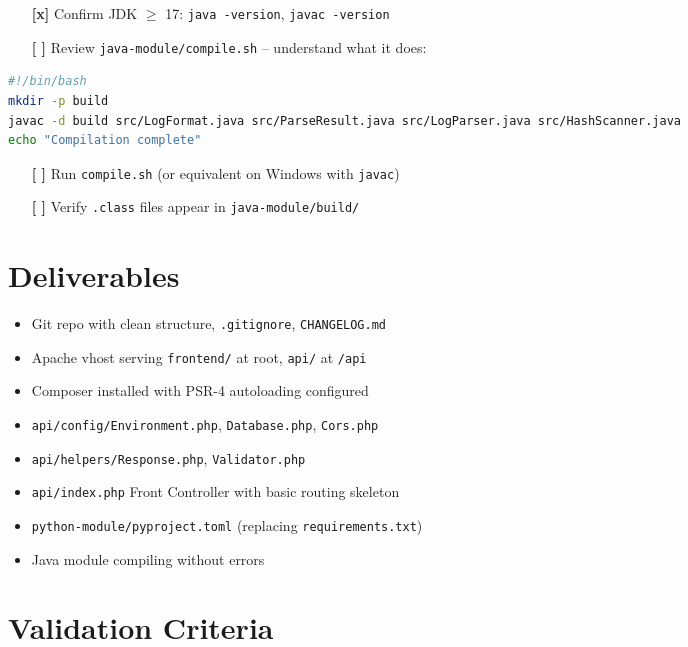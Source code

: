\documentclass[11pt,a4paper]{report}
\newcommand{\todo}{\textcolor{helixamber}{\textbf{[ ]}}}
\newcommand{\done}{\textcolor{helixteal}{\textbf{[x]}}}
\newcommand{\filepath}[1]{\texttt{\small#1}}
\begin{document}
\begin{itemize}
    \item[\done] Confirm JDK $\geq$ 17: \texttt{java -version}, \texttt{javac -version}
    \item[\todo] Review \filepath{java-module/compile.sh} -- understand what it does:
\end{itemize}

\begin{lstlisting}[language=bash]
#!/bin/bash
mkdir -p build
javac -d build src/LogFormat.java src/ParseResult.java src/LogParser.java src/HashScanner.java
echo "Compilation complete"
\end{lstlisting}

\begin{itemize}
    \item[\todo] Run \filepath{compile.sh} (or equivalent on Windows with \texttt{javac})
    \item[\todo] Verify \texttt{.class} files appear in \filepath{java-module/build/}
\end{itemize}

\section*{Deliverables}

\begin{itemize}
    \item Git repo with clean structure, \filepath{.gitignore}, \filepath{CHANGELOG.md}
    \item Apache vhost serving \filepath{frontend/} at root, \filepath{api/} at \texttt{/api}
    \item Composer installed with PSR-4 autoloading configured
    \item \filepath{api/config/Environment.php}, \filepath{Database.php}, \filepath{Cors.php}
    \item \filepath{api/helpers/Response.php}, \filepath{Validator.php}
    \item \filepath{api/index.php} Front Controller with basic routing skeleton
    \item \filepath{python-module/pyproject.toml} (replacing \filepath{requirements.txt})
    \item Java module compiling without errors
\end{itemize}

\section*{Validation Criteria}
\end{document}
